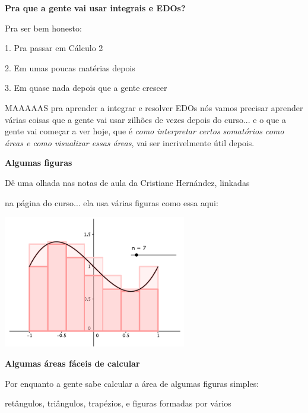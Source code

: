 \documentclass[oneside,12pt]{article}
\begin{document}
\newpage


{\bf Pra que a gente vai usar integrais e EDOs?}

Pra ser bem honesto:

1. Pra passar em Cálculo 2

2. Em umas poucas matérias depois

3. Em quase nada depois que a gente crescer

\msk

MAAAAAS pra aprender a integrar e resolver EDOs nós vamos precisar
aprender várias coisas que a gente vai usar zilhões de vezes depois do
curso... e o que a gente vai começar a ver hoje, que é {\sl como
  interpretar certos somatórios como áreas e como visualizar essas
  áreas}, vai ser incrivelmente útil depois.



\newpage


{\bf Algumas figuras}

Dê uma olhada nas notas de aula da Cristiane Hernández, linkadas

na página do curso... ela usa várias figuras como essa aqui:


\includegraphics[width=8cm]{2020-1-C2/area-hernandez-1.png}


\newpage


{\bf Algumas áreas fáceis de calcular}

Por enquanto a gente sabe calcular a área de algumas figuras simples:

retângulos, triângulos, trapézios, e figuras formadas por vários
\end{document}
